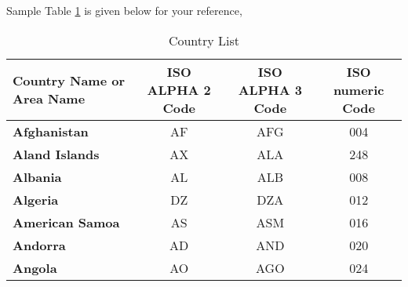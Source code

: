 Sample Table \ref{c5:tab1} is given below for your reference,

\begin{table}[htb]
\fontsize{10}{12}\selectfont
\caption{Country List}
\label{c5:tab1}
\begin{tabular}{|p{3cm}|c|c|c|}
	\hline
	\textbf{Country Name     or Area Name}& \textbf {ISO ALPHA 2 Code} & \textbf {ISO ALPHA 3 Code} & \textbf{ISO numeric Code}\\
	\hline
	\textbf{Afghanistan}   & AF    & AFG &   004\\\hline
	\textbf{Aland Islands}&   AX  & ALA   & 248\\\hline
	\textbf{Albania} & AL & ALB&  008\\\hline
	\textbf{Algeria}    &DZ & DZA&  012\\\hline
	\textbf{American Samoa}&   AS  & ASM&016\\\hline
	\textbf{Andorra}& AD  & AND   & 020\\\hline
	\textbf{Angola}& AO  & AGO& 024\\
	\hline
\end{tabular}
\end{table}


